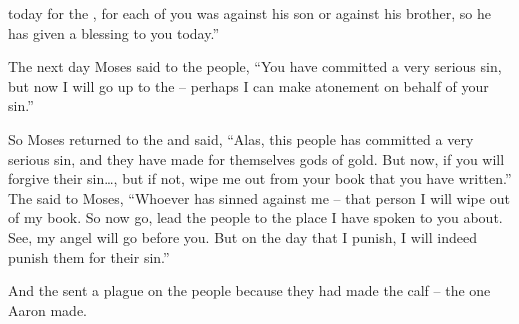 {today
for the
{}, for
each
of you
was against
his son
or against
his brother,
so he has given
a blessing
to you today.”
\par }{\PP {}The next
day Moses
said
to
the people, “You
have committed
a very serious
sin, but now
I will go up
to
the {} –
perhaps
I can make atonement
on behalf
of your sin.”
\par }{\PP {}So Moses
returned
to
the {}
and said,
“Alas,
this
people
has committed
a very serious
sin, and they have made
for themselves gods
of gold.
But now,
if
you will forgive
their sin…, but if
not,
wipe
me
out
from your book
that
you have written.”
The
{}
said
to
Moses,
“Whoever
has sinned against me – that person I will wipe out of my book.
So now
go,
lead
the
people
to
the place I have
spoken
to you about. See,
my angel
will go
before
you. But on the day
that I punish,
I will indeed punish
them for their sin.”
\par }{\PP {}And the
{}
sent a plague
on the people
because
they had
made
the calf –
the one Aaron
made.


}
